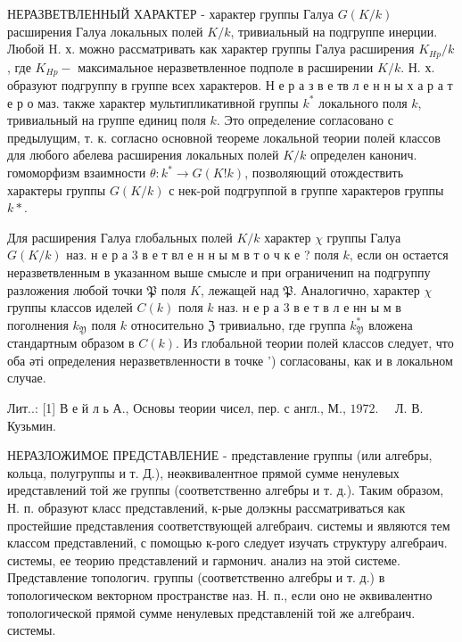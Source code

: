 \documentclass[10pt]{article}
\begin{document}
НЕРАЗВЕТВЛЕННЫЙ ХАРАКТЕР - характер группы Галуа $G(K / k)$ расширения Галуа локальных полей $K / k$, тривиальный на подгруппе инерции. Любой H. х. можно рассматривать как характер группы Галуа расширения $K_{H p} / k$, где $K_{H p}-$ максимальное неразветвленное подполе в расширении $K / k$. Н. х. образуют подгруппу в группе всех характеров. Н е р а з в е тв л е н н ы х а р а т е р о маз. также характер мультипликативной группы $k^{*}$ локального поля $k$, тривиальный на группе единиц поля $k$. Это определение согласовано с предылущим, т. к. согласно основной теореме локальной теории полей классов для любого абелева расширения локальных полей $K / k$ определен канонич. гомоморфизм взаимности $\theta: k^{*} \rightarrow G(K ! k)$, позволяющий отождествить характеры группы $G(K / k)$ с нек-рой подгруппой в группе характеров группы $k *$.



Для расширения Галуа глобальных полей $K / k$ характер $\chi$ группы Галуа $G(K / k)$ наз. н е р а 3 в е т вл е н н ы м в т о ч к е ? поля $k$, если он остается неразветвленным в указанном выше смысле и при ограниченип на подгруппу разложения любой точки $\mathfrak{P}$ поля $K$, лежащей над $\mathfrak{P}$. Аналогично, характер $\chi$ группы классов иделей $C(k)$ поля $k$ наз. н е р а 3 в е т в л е нн ы м в поголнения $k_{\mathfrak{Y}}$ поля $k$ относительно $\mathfrak{Z}$ тривиально, где группа $k_{\mathfrak{Y}}^{*}$ вложена стандартным образом в $C(k)$. Из глобальной теории полей классов следует, что оба әті определения неразветвленности в точке ') согласованы, как и в локальном случае.



Лит..: [1] В е й л ь А., Основы теории чисел, пер. с англ., М., $1972 . \quad$ Л. В. Кузьмин.



НЕРАЗЛОЖИМОЕ ПРЕДСТАВЛЕНИЕ - представление группы (или алгебры, кольца, полугруппы и т. Д.), неәквивалентное прямой сумме ненулевых иредставлений той же группы (соответственно алгебры и т. д.). Таким образом, Н. п. образуют класс представлений, к-рые долэкны рассматриваться как простейшие представления соответствующей алгебраич. системы и являются тем классом представлений, с помощью к-рого следует изучать структуру алгебраич. системы, ее теорию представлений и гармонич. анализ на этой системе. Представление топологич. группы (соответственно алгебры и т. д.) в топологическом векторном пространстве наз. Н. п., если оно не әквивалентно топологической прямой сумме ненулевых представленій той же алгебраич. системы.
\end{document}

